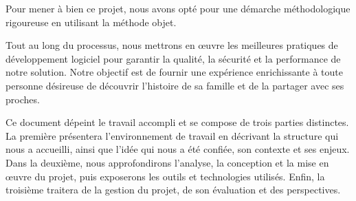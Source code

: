 Pour mener à bien ce projet, nous avons opté pour une démarche méthodologique
rigoureuse en utilisant la méthode objet.

Tout au long du processus, nous mettrons en œuvre les meilleures pratiques de
développement logiciel pour garantir la qualité, la sécurité et la performance
de notre solution. Notre objectif est de fournir une expérience enrichissante à toute
personne désireuse de découvrir l’histoire de sa famille et de la
partager avec ses proches.

Ce document dépeint le travail accompli et se compose de trois parties distinctes.
La première présentera l’environnement de travail en décrivant la structure qui
nous a accueilli, ainsi que l’idée qui nous a été confiée, son contexte et ses
enjeux. Dans la deuxième, nous approfondirons l’analyse, la conception et la
mise en œuvre du projet, puis exposerons les outils et technologies utilisés.
Enfin, la troisième traitera de la gestion du projet, de son évaluation et des perspectives.

